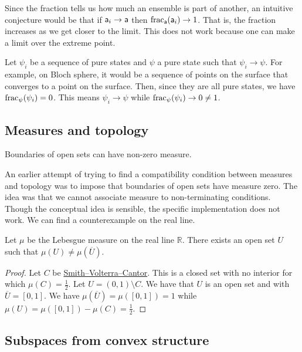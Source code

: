Since the fraction tells us how much an ensemble is part of another, an intuitive conjecture would be that if $\ens[a]_i \to \ens[a]$ then $\size_{\ens[a]}(\ens[a]_i) \to 1$. That is, the fraction increases as we get closer to the limit. This does not work because one can make a limit over the extreme point.

\begin{example}
	Let $\psi_i$ be a sequence of pure states and $\psi$ a pure state such that $\psi_i \to \psi$. For example, on Bloch sphere, it would be a sequence of points on the surface that converges to a point on the surface. Then, since they are all pure states, we have $\size_{\psi}(\psi_i) = 0$. This means $\psi_i \to \psi$ while $\size_{\psi}(\psi_i) \to 0 \neq 1$.
\end{example}

\subsection{Measures and topology}

\begin{insight}
	Boundaries of open sets can have non-zero measure.
\end{insight}

An earlier attempt of trying to find a compatibility condition between measures and topology was to impose that boundaries of open sets have measure zero. The idea was that we cannot associate measure to non-terminating conditions. Though the conceptual idea is sensible, the specific implementation does not work. We can find a counterexample on the real line. 

\begin{prop}
	Let $\mu$ be the Lebesgue measure on the real line $\mathbb{R}$. There exists an open set $U$ such that $\mu(U) \neq \mu(\overline{U})$.
\end{prop}

\begin{proof}
	Let $C$ be \href{https://en.wikipedia.org/wiki/Smith%E2%80%93Volterra%E2%80%93Cantor_set}{Smith–Volterra–Cantor}. This is a closed set with no interior for which $\mu(C) = \frac{1}{2}$. Let $U = (0,1) \setminus C$. We have that $U$ is an open set and with $\overline{U} = [0,1]$. We have $\mu(\overline{U}) = \mu([0,1]) = 1$ while $\mu(U) = \mu([0,1]) - \mu(C) = \frac{1}{2}$.
\end{proof}

\subsection{Subspaces from convex structure}\label{pm_es_failureConvexSubspace}

